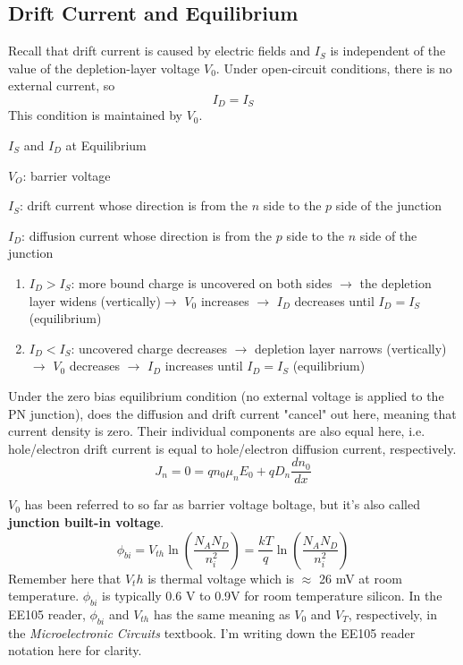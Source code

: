 \subsection{Drift Current and Equilibrium}
Recall that drift current is caused by electric fields and $I_S$ is independent of the value of the depletion-layer voltage $V_0$. Under open-circuit conditions, there is no external current, so 
    \[I_D = I_S\]
This condition is maintained by $V_0$.
\begin{Analysis}{$I_S$ and $I_D$ at Equilibrium}{}
    \begin{gline}
        \item $V_O$: barrier voltage
        \item $I_S$: drift current whose direction is from the $n$ side to the $p$ side of the junction
        \item $I_D$: diffusion current whose direction is from the $p$ side to the $n$ side of the junction
    \end{gline}
    \begin{enumerate}
        \item \textbf{$I_D > I_S$}: more bound charge is uncovered on both sides $\rightarrow$ the depletion layer widens (vertically)$\rightarrow$ $V_0$ increases $\rightarrow$ $I_D$ decreases until $I_D = I_S$ (equilibrium)
        \item \textbf{$I_D < I_S$}: uncovered charge decreases $\rightarrow$ depletion layer narrows (vertically) $\rightarrow$ $V_0$ decreases $\rightarrow$ $I_D$ increases until $I_D = I_S$ (equilibrium)
    \end{enumerate}
\end{Analysis}

Under the zero bias equilibrium condition (no external voltage is applied to the PN junction), does the diffusion and drift current "cancel" out here, meaning that current density is zero. Their individual components are also equal here, i.e. hole/electron drift current is equal to hole/electron diffusion current, respectively.
    \[J_n = 0 = qn_0 \mu_n E_0 + q D_n \frac{dn_0}{dx}\]

$V_0$ has been referred to so far as barrier voltage boltage, but it's also called \textbf{junction built-in voltage}.
    \[\phi_{bi} = V_{th} \ln \left(\frac{N_A N_D}{n_i^2}\right) = \frac{kT}{q} \ln \left(\frac{N_A N_D}{n_i^2}\right)\]
Remember here that $V_th$ is thermal voltage which is $\approx$ 26 mV at room temperature. $\phi_{bi}$ is typically 0.6 V to 0.9V for room temperature silicon. In the EE105 reader, $\phi_{bi}$ and $V_{th}$ has the same meaning as $V_0$ and $V_T$, respectively, in the \textit{Microelectronic Circuits} textbook. I'm writing down the EE105 reader notation here for clarity.

